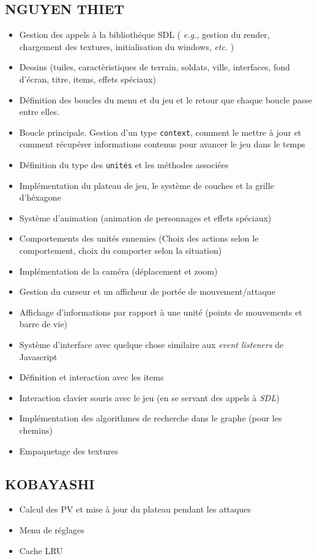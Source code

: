\documentclass{article}
\begin{document}
\subsection{NGUYEN THIET}
\begin{itemize}
    \item Gestion des appels à la bibliothéque SDL ( \textit{e.g.,} gestion du render, chargement des textures, initialisation
    du windows, \textit{etc.} )
    \item Dessins (tuiles, caractèristiques de terrain, soldats, ville, interfaces, fond d'écran, titre, items, effets spéciaux)
    \item Définition des boucles du menu et du jeu et le retour que chaque boucle passe entre elles.
    \item Boucle principale. Gestion d'un type \texttt{context}, comment le mettre à jour et comment récupérer informations contenus pour avancer le jeu dans le temps
    \item Définition du type des \texttt{unités} et les méthodes associées
    \item Implémentation du plateau de jeu, le système de couches et la grille d'héxagone 
    \item Système d'animation (animation de personnages et effets spéciaux)
    \item Comportements des unités ennemies (Choix des actions selon le comportement, choix du comporter selon la situation)
    \item Implémentation de la caméra (déplacement et zoom)
    \item Gestion du curseur et un afficheur de portée de mouvement/attaque
    \item Affichage d'informations par rapport à une unité (points de mouvements et barre de vie)
    \item Système d'interface avec quelque chose similaire aux \textit{event listeners} de Javascript
    \item Définition et interaction avec les items
    \item Interaction clavier souris avec le jeu (en se servant des appels à \textit{SDL})
    \item Implémentation des algorithmes de recherche dans le graphe (pour les chemins)
    \item Empaquetage des textures
\end{itemize}

\subsection{KOBAYASHI}
\begin{itemize}
    \item Calcul des PV et mise à jour du plateau pendant les attaques 
    \item Menu de réglages 
    \item Cache LRU %
\end{itemize}
\end{document}
